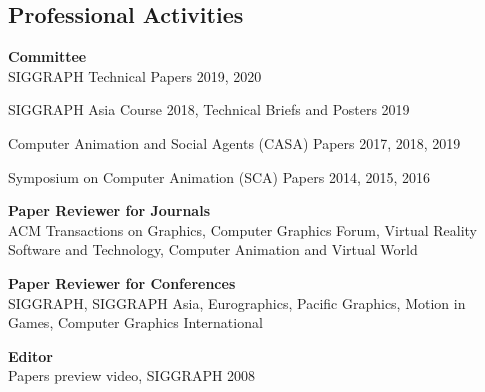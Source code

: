 \documentclass[margin,line]{res}
\begin{document}
\begin{resume}

\section{\sc Professional Activities}
{\bf Committee} \\
SIGGRAPH Technical Papers 2019, 2020

\vspace*{-.15in}
SIGGRAPH Asia Course 2018, Technical Briefs and Posters 2019 

\vspace*{-.17in}
Computer Animation and Social Agents (CASA) Papers 2017, 2018, 2019

\vspace*{-.17in}
Symposium on Computer Animation (SCA) Papers 2014, 2015, 2016

\vspace*{-.1in}
{\bf Paper Reviewer for Journals} \\
ACM Transactions on Graphics, Computer Graphics Forum, Virtual Reality Software and Technology, Computer Animation and Virtual World

{\bf Paper Reviewer for Conferences} \\
SIGGRAPH, SIGGRAPH Asia, Eurographics, Pacific Graphics, Motion in Games, Computer Graphics International

\vspace*{-.1in}
{\bf Editor} \\
Papers preview video, SIGGRAPH 2008



\end{resume}
\end{document}
